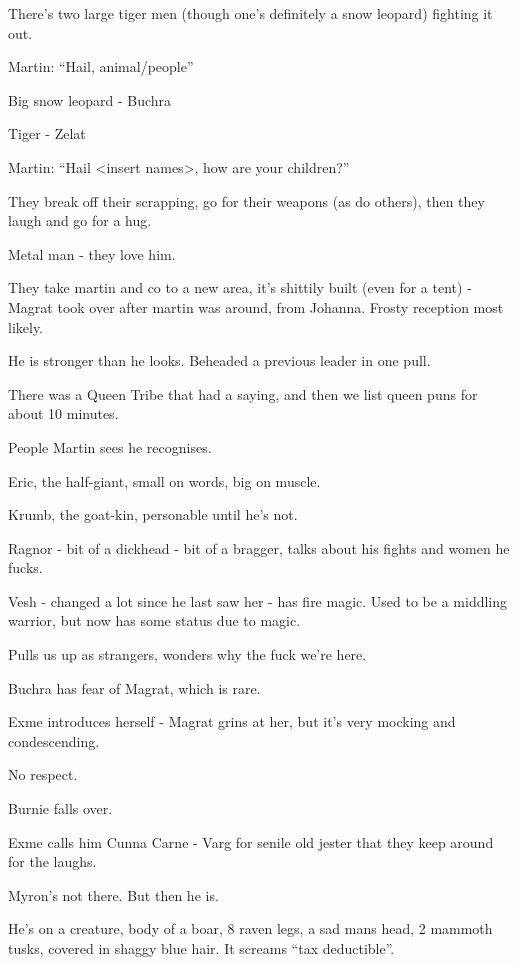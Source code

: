 There’s two large tiger men (though one’s definitely a snow leopard) fighting it out.\medskip

Martin: “Hail, animal/people”\medskip

Big snow leopard - Buchra\medskip

Tiger - Zelat\medskip

Martin: “Hail <insert names>, how are your children?”\medskip

They break off their scrapping, go for their weapons (as do others), then they laugh and go for a hug.\medskip

Metal man - they love him.\medskip

They take martin and co to a new area, it’s shittily built (even for a tent) - Magrat took over after martin was around, from Johanna. Frosty reception most likely.\medskip

He is stronger than he looks. Beheaded a previous leader in one pull.\medskip

There was a Queen Tribe that had a saying, and then we list queen puns for about 10 minutes.\medskip

People Martin sees he recognises.\medskip

Eric, the half-giant, small on words, big on muscle.\medskip

Krumb, the goat-kin, personable until he’s not.\medskip

Ragnor - bit of a dickhead - bit of a bragger, talks about his fights and women he fucks.\medskip

Vesh - changed a lot since he last saw her - has fire magic. Used to be a middling warrior, but now has some status due to magic.\medskip

Pulls us up as strangers, wonders why the fuck we’re here.\medskip

Buchra has fear of Magrat, which is rare.\medskip

Exme introduces herself - Magrat grins at her, but it’s very mocking and condescending.\medskip

No respect.\medskip

Burnie falls over.\medskip

Exme calls him Cunna Carne - Varg for senile old jester that they keep around for the laughs.\medskip

Myron’s not there. But then he is.\medskip

He’s on a creature, body of a boar, 8 raven legs, a sad mans head, 2 mammoth tusks, covered in shaggy blue hair. It screams “tax deductible”.\medskip

